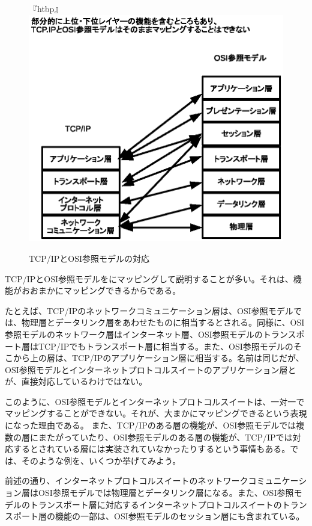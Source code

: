 \begin{figure}『htbp』
	\includegraphics[width=12cm,clip]{draw/osimap.eps}
	\caption{TCP/IPとOSI参照モデルの対応}
	\label{fig:mapping}
\end{figure}

TCP/IPとOSI参照モデルをにマッピングして説明することが多い。それは、機能がおおまかにマッピングできるからである。

たとえば、TCP/IPのネットワークコミュニケーション層は、OSI参照モデルでは、物理層とデータリンク層をあわせたものに相当するとされる。同様に、OSI参照モデルのネットワーク層はインターネット層、OSI参照モデルのトランスポート層はTCP/IPでもトランスポート層に相当する。また、OSI参照モデルのそこから上の層は、TCP/IPのアプリケーション層に相当する。名前は同じだが、OSI参照モデルとインターネットプロトコルスイートのアプリケーション層とが、直接対応しているわけではない。

このように、OSI参照モデルとインターネットプロトコルスイートは、一対一でマッピングすることができない。それが、大まかにマッピングできるという表現になった理由である。
また、TCP/IPのある層の機能が、OSI参照モデルでは複数の層にまたがっていたり、OSI参照モデルのある層の機能が、TCP/IPでは対応するとされている層には実装されていなかったりするという事情もある。では、そのような例を、いくつか挙げてみよう。

前述の通り、インターネットプロトコルスイートのネットワークコミュニケーション層はOSI参照モデルでは物理層とデータリンク層になる。また、OSI参照モデルのトランスポート層に対応するインターネットプロトコルスイートのトランスポート層の機能の一部は、OSI参照モデルのセッション層にも含まれている。

